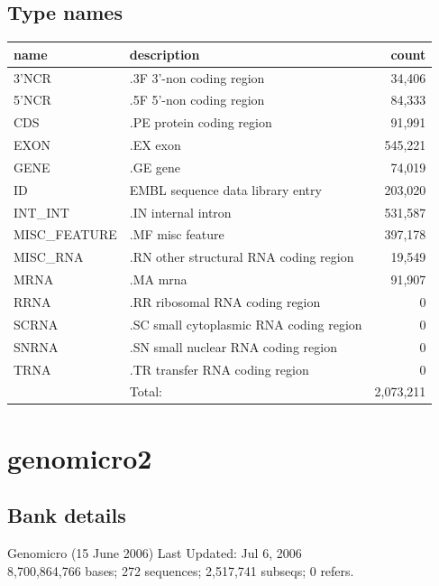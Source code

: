 \documentclass{article}
\begin{document}
\begin{Schunk}
\subsection{Type names}
\noindent\begin{tabular}{llr}
\hline \hline
name & description & count \\
\hline
3'NCR  &  .3F  3'-non coding region  &  34,406 \\
5'NCR  &  .5F  5'-non coding region  &  84,333 \\
CDS  &  .PE protein coding region  &  91,991 \\
EXON  &  .EX exon  &  545,221 \\
GENE  &  .GE gene  &  74,019 \\
ID  &  EMBL sequence data library entry  &  203,020 \\
INT\_INT  &  .IN  internal intron  &  531,587 \\
MISC\_FEATURE  &  .MF misc feature  &  397,178 \\
MISC\_RNA  &  .RN other structural RNA coding region  &  19,549 \\
MRNA  &  .MA mrna  &  91,907 \\
RRNA  &  .RR ribosomal RNA coding region  &  0 \\
SCRNA  &  .SC small cytoplasmic RNA coding region  &  0 \\
SNRNA  &  .SN small nuclear RNA coding region  &  0 \\
TRNA  &  .TR transfer RNA coding region  &  0 \\
\hline
 & Total: & 2,073,211 \\
\hline \hline
\end{tabular}

\section{ genomicro2 }
\subsection{Bank details}
Genomicro (15 June 2006) Last Updated: Jul  6, 2006\\
8,700,864,766 bases; 272 sequences; 2,517,741 subseqs; 0 refers.\\
\\
\\



\end{Schunk}
\end{document}
